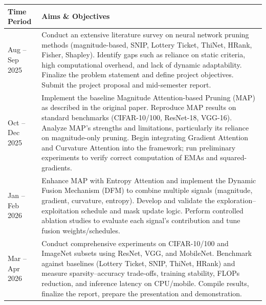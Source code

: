 \documentclass[12pt,a4paper]{report}
\begin{document}
\begin{tabularx}{\textwidth}{|>{\raggedright\arraybackslash}p{}|>{\raggedright\arraybackslash}X|}
\hline
\textbf{Time Period} & \textbf{Aims \& Objectives} \\
\hline
Aug -- Sep 2025 &
Conduct an extensive literature survey on neural network pruning methods (magnitude-based, SNIP, Lottery Ticket, ThiNet, HRank, Fisher, Shapley). Identify gaps such as reliance on static criteria, high computational overhead, and lack of dynamic adaptability. Finalize the problem statement and define project objectives. Submit the project proposal and mid-semester report. \\
\hline
Oct -- Dec 2025 &
Implement the baseline Magnitude Attention-based Pruning (MAP) as described in the original paper. Reproduce MAP results on standard benchmarks (CIFAR-10/100, ResNet-18, VGG-16). Analyze MAP's strengths and limitations, particularly its reliance on magnitude-only pruning. Begin integrating Gradient Attention and Curvature Attention into the framework; run preliminary experiments to verify correct computation of EMAs and squared-gradients. \\
\hline
Jan -- Feb 2026 &
Enhance MAP with Entropy Attention and implement the Dynamic Fusion Mechanism (DFM) to combine multiple signals (magnitude, gradient, curvature, entropy). Develop and validate the exploration–exploitation schedule and mask update logic. Perform controlled ablation studies to evaluate each signal's contribution and tune fusion weights/schedules. \\
\hline
Mar -- Apr 2026 &
Conduct comprehensive experiments on CIFAR-10/100 and ImageNet subsets using ResNet, VGG, and MobileNet. Benchmark against baselines (Lottery Ticket, SNIP, ThiNet, HRank) and measure sparsity–accuracy trade-offs, training stability, FLOPs reduction, and inference latency on CPU/mobile. Compile results, finalize the report, prepare the presentation and demonstration. \\
\hline
\end{tabularx}

\clearpage
\end{document}
